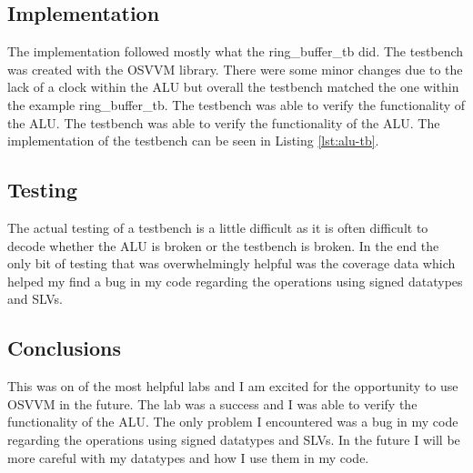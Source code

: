 \documentclass{article}
\begin{document}
\subsection*{Implementation}
The implementation followed mostly what the ring\_buffer\_tb did. The testbench was created with the OSVVM library. There were some minor changes due to the lack of a clock within the ALU but overall the testbench matched the one within the example ring\_buffer\_tb. The testbench was able to verify the functionality of the ALU. The testbench was able to verify the functionality of the ALU. The implementation of the testbench can be seen in Listing \ref{lst:alu-tb}.

\subsection*{Testing}
The actual testing of a testbench is a little difficult as it is often difficult to decode whether the ALU is broken or the testbench is broken. In the end the only bit of testing that was overwhelmingly helpful was the coverage data which helped my find a bug in my code regarding the operations using signed datatypes and SLVs.
\subsection*{Conclusions}
This was on of the most helpful labs and I am excited for the opportunity to use OSVVM in the future. The lab was a success and I was able to verify the functionality of the ALU. The only problem I encountered was a bug in my code regarding the operations using signed datatypes and SLVs. In the future I will be more careful with my datatypes and how I use them in my code.
\end{document}
